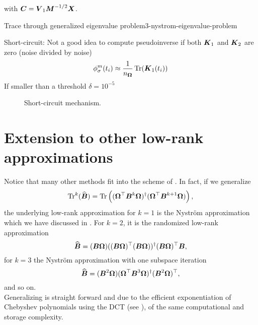with $\boldsymbol{C} = \boldsymbol{V}_1 \boldsymbol{M}^{-1/2} \boldsymbol{X}$.

\begin{algo}{Trace through generalized eigenvalue problem}{3-nystrom-eigenvalue-problem}
    
\end{algo}


Short-circuit: Not a good idea to compute pseudoinverse if
both $\boldsymbol{K}_1$ and $\boldsymbol{K}_2$ are zero (noise divided by noise)
\begin{equation}
    \phi_{\sigma}^m(t_i) \approx \frac{1}{n_{\boldsymbol{\Omega}}} \operatorname{Tr}(\boldsymbol{K}_1(t_i))
    \label{equ:3-nystrom-shortcircuit-hutchinson}
\end{equation}
If smaller than a threshold $\delta = 10^{-5}$

\begin{figure}[ht]
    \centering
    
    \caption{Short-circuit mechanism.}
    \label{fig:3-nystrom-short-circuit-mechanism}
\end{figure}


\section{Extension to other low-rank approximations}
\label{sec:3-nystrom-other-low-rank}

Notice that many other methods \cite{halko2011finding,tropp2023randomized} fit
into the scheme of . In fact, if we
generalize
\begin{equation}
    \operatorname{Tr}^{k}(\widehat{\boldsymbol{B}})
        = \operatorname{Tr}\left((\boldsymbol{\Omega}^{\top} \boldsymbol{B}^k \boldsymbol{\Omega})^{\dagger} (\boldsymbol{\Omega}^{\top} \boldsymbol{B}^{k+1} \boldsymbol{\Omega}) \right),
    \label{equ:3-nystrom-trace-generalization}
\end{equation}
the underlying low-rank approximation for $k=1$ is the Nystr\"om approximation
which we have discussed in .
For $k=2$, it is the randomized low-rank approximation  \cite{halko2011finding, tropp2023randomized}
\begin{equation}
    \widehat{\boldsymbol{B}} = (\boldsymbol{B} \boldsymbol{\Omega}) ((\boldsymbol{B} \boldsymbol{\Omega})^{\top} (\boldsymbol{B} \boldsymbol{\Omega}))^{\dagger} (\boldsymbol{B} \boldsymbol{\Omega})^{\top} \boldsymbol{B},
    \label{equ:3-nystrom-RSVD-rewritten}
\end{equation}
for $k=3$ the Nystr\"om approximation with one subspace iteration \cite{tropp2023randomized}
\begin{equation}
    \widehat{\boldsymbol{B}} = (\boldsymbol{B}^2 \boldsymbol{\Omega}) (\boldsymbol{\Omega}^{\top} \boldsymbol{B}^3 \boldsymbol{\Omega})^{\dagger} (\boldsymbol{B}^2 \boldsymbol{\Omega})^{\top},
    \label{equ:3-nystrom-nystrom-SI}
\end{equation}
and so on.\\

Generalizing  is straight forward and
due to the efficient exponentiation of Chebyshev polynomials using the \gls{DCT}
(see ), of the same
computational and storage complexity.
